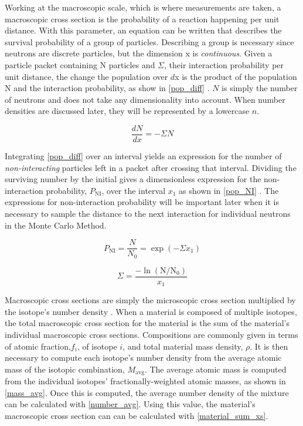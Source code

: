 Working at the macroscopic scale, which is where measurements are taken, a macroscopic cross section is the probability of a reaction happening per unit distance.  With this parameter, an equation can be written that describes the survival probability of a group of particles.  Describing a group is necessary since neutrons are discrete particles, but the dimension x is \emph{continuous}.  Given a particle packet containing N particles and $\Sigma$, their interaction probability per unit distance, the change the population over $d$x is the product of the population N and the interaction probability, as show in \eqref{pop_diff} \cite{duderstadt}.  $N$ is simply the number of neutrons and does not take any dimensionality into account.  When number densities are discussed later, they will be represented by a lowercase $n$.

\begin{equation}
\frac{d N}{d x} = - \Sigma N
\label{pop_diff}
\end{equation}

Integrating \eqref{pop_diff} over an interval yields an expression for the number of \emph{non-interacting} particles left in a packet after crossing that interval.  Dividing the surviving number by the initial gives a dimensionless expression for the non-interaction probability, $P_\mathrm{NI}$, over the interval $x_1$ as shown in \eqref{pop_NI} \cite{duderstadt}.  The expressions for non-interaction probability will be important later when it is necessary to sample the distance to the next interaction for individual neutrons in the Monte Carlo Method.

\begin{equation}
P_\mathrm{NI} = \frac{N}{N_0} = \exp \left(- \Sigma x_1 \right)
\label{pop_NI}
\end{equation}

\begin{equation}
\Sigma = \frac{ - \ln \left(    \mathrm{N} / \mathrm{N}_0  \right )  }  {x_1}
\label{pop_beam}
\end{equation}

Macroscopic cross sections are simply the microscopic cross section multiplied by the isotope's number density \cite{duderstadt}.  When a material is composed of multiple isotopes, the total macroscopic cross section for the material is the sum of the material's individual macroscopic cross sections.  Compositions are commonly given in terms of atomic fraction,$f_i$, of isotope $i$, and total material mass density, $\rho$.  It is then necessary to compute each isotope's number density from the average atomic mass of the isotopic combination, $M_\mathrm{avg}$.  The average atomic mass is computed from the individual isotopes' fractionally-weighted atomic masses, as shown in \eqref{mass_avg}.  Once this is computed, the average number density of the mixture can be calculated with \eqref{number_avg}.  Using this value, the material's macroscopic cross section can can be calculated with \eqref{material_sum_xs}.

